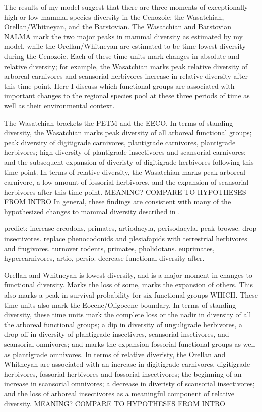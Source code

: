 \documentclass[12pt,letterpaper]{article}
\begin{document}
The results of my model suggest that there are three moments of exceptionally high or low mammal species diversity in the Cenozoic: the Wasatchian, Orellan/Whitneyan, and the Barstovian. The Wasatchian and Barstovian NALMA mark the two major peaks in mammal diversity as estimated by my model, while the Orellan/Whitneyan are estimated to be time lowest diversity during the Cenozoic. Each of these time units mark changes in absolute and relative diversity; for example, the Wasatchian marks peak relative diversity of arboreal carnivores and scansorial herbivores increase in relative diversity after this time point. Here I discuss which functional groups are associated with important changes to the regional species pool at these three periods of time as well as their environmental context.


The Wasatchian brackets the PETM and the EECO. In terms of standing diversity, the Wasatchian marks peak diversity of all arboreal functional groups; peak diversity of digitigrade carnivores, plantigrade carnivores, plantigrade herbivores; high diversity of plantigrade insectivores and scansorial carnivores; and the subsequent expansion of diveristy of digitigrade herbivores following this time point. In terms of relative diversity, the Wasatchian marks peak arboreal carnivore, a low amount of fossorial herbivores, and the expansion of scansorial herbivores after this time point. \uppercase{meaning? compare to hypotheses from intro}
In general, these findings are consistent with many of the hypothesized changes to mammal diversity described in \citet{Woodburne2009}.


predict: increase creodons, primates, artiodacyla, perisodacyla. peak browse. drop insectivores. replace phenocodonids and plesiafapids with terrestrial herbivores and frugivores. turnover rodents, primates, pholidotans. euprimates, hypercarnivores, artio, persio. decrease functional diversity after.



Orellan and Whitneyan is lowest diversity, and is a major moment in changes to functional diversity. Marks the loss of some, marks the expansion of others. This also marks a peak in survival probability for six functional groups WHICH. These time units also mark the Eocene/Oligocene boundary. In terms of standing diversity, these time units mark the complete loss or the nadir in diversity of all the arboreal functional groups; a dip in diversity of unguligrade herbivores, a drop off in diversity of plantigrade insectivres, scansorial insetivores, and scansorial omnivores; and marks the expansion fossorial functional groups as well as plantigrade omnivores. In terms of relative diveristy, the Orellan and Whitneyan are associated with an increase in digitigrade carnivores, digitigrade herbivores, fossorial herbivores and fossorial insectivores; the beginning of an increase in scansorial omnivores; a decrease in diveristy of scansorial insectivores; and the loss of arboreal insectivores as a meaningful component of relative diversity. \uppercase{meaning? compare to hypotheses from intro}
\end{document}
